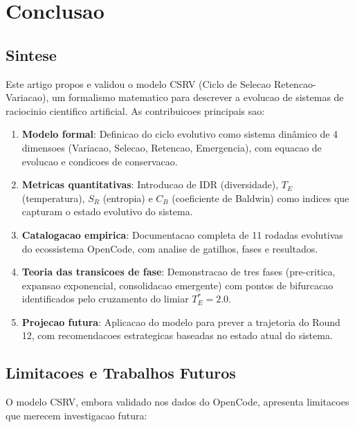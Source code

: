 \documentclass[5p]{elsarticle}
\begin{document}
\section{Conclusao}

\subsection{Sintese}

Este artigo propos e validou o modelo CSRV (Ciclo de Selecao Retencao-Variacao),
um formalismo matematico para descrever a evolucao de sistemas de raciocinio
cientifico artificial. As contribuicoes principais sao:

\begin{enumerate}[label=(\arabic*)]
  \item \textbf{Modelo formal}: Definicao do ciclo evolutivo como sistema
    dinâmico de 4 dimensoes (Variacao, Selecao, Retencao, Emergencia),
    com equacao de evolucao e condicoes de conservacao.

  \item \textbf{Metricas quantitativas}: Introducao de IDR (diversidade),
    $T_E$ (temperatura), $S_R$ (entropia) e $C_B$ (coeficiente de Baldwin)
    como indices que capturam o estado evolutivo do sistema.

  \item \textbf{Catalogacao empirica}: Documentacao completa de 11 rodadas
    evolutivas do ecossistema OpenCode, com analise de gatilhos, fases e
    resultados.

  \item \textbf{Teoria das transicoes de fase}: Demonstracao de tres fases
    (pre-critica, expansao exponencial, consolidacao emergente) com pontos
    de bifurcacao identificados pelo cruzamento do limiar $T_E^* = 2.0$.

  \item \textbf{Projecao futura}: Aplicacao do modelo para prever a trajetoria
    do Round 12, com recomendacoes estrategicas baseadas no estado atual
    do sistema.
\end{enumerate}

\subsection{Limitacoes e Trabalhos Futuros}

O modelo CSRV, embora validado nos dados do OpenCode, apresenta limitacoes
que merecem investigacao futura:
\end{document}

